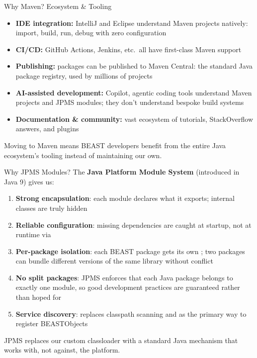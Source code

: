 \begin{frame}{Why Maven? Ecosystem \& Tooling}
\begin{itemize}
\item \textbf{IDE integration:} IntelliJ and Eclipse understand Maven projects natively: import, build, run, debug with zero configuration
\item \textbf{CI/CD:} GitHub Actions, Jenkins, etc.\ all have first-class Maven support
\item \textbf{Publishing:} packages can be published to Maven Central: the standard Java package registry, used by millions of projects
\item \textbf{AI-assisted development:} Copilot, agentic coding tools understand Maven projects and JPMS modules; they don't understand bespoke build systems
\item \textbf{Documentation \& community:} vast ecosystem of tutorials, StackOverflow answers, and plugins
\end{itemize}

\vspace{0.5em}
\begin{block}{}
Moving to Maven means BEAST developers benefit from the entire Java ecosystem's tooling instead of maintaining our own.
\end{block}
\end{frame}

\begin{frame}{Why JPMS Modules?}
The \textbf{Java Platform Module System} (introduced in Java 9) gives us:

\vspace{0.5em}
\begin{enumerate}
\item \textbf{Strong encapsulation}: each module declares what it exports; internal classes are truly hidden
\item \textbf{Reliable configuration}: missing dependencies are caught at startup, not at runtime via 
\item \textbf{Per-package isolation}: each BEAST package gets its own ; two packages can bundle different versions of the same library without conflict
\item \textbf{No split packages}: JPMS enforces that each Java package belongs to exactly one module, so good development practices are guaranteed rather than hoped for
\item \textbf{Service discovery}:  replaces classpath scanning and  as the primary way to register BEASTObjects
\end{enumerate}

\vspace{0.5em}
\begin{alertblock}{}
JPMS replaces our custom classloader with a standard Java mechanism that works with, not against, the platform.
\end{alertblock}
\end{frame}

